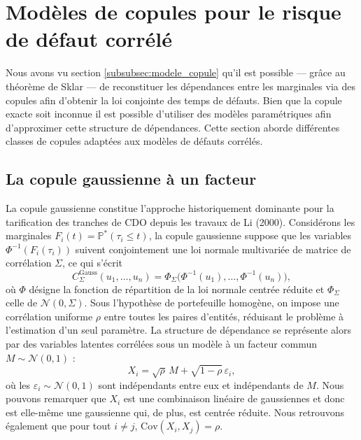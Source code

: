 \section{Modèles de copules pour le risque de défaut corrélé}

Nous avons vu section \ref{subsubsec:modele_copule} qu'il est possible --- grâce au théorème de Sklar ---
de reconstituer les dépendances entre les marginales via des copules afin d'obtenir la loi conjointe 
des temps de défauts. Bien que la copule exacte soit inconnue il est possible d'utiliser des modèles
paramétriques afin d'approximer cette structure de dépendances. Cette section aborde différentes
classes de copules adaptées aux modèles de défauts corrélés.

\subsection{La copule gaussienne à un facteur}\label{subsec:copule_gauss}

La copule gaussienne constitue l'approche historiquement dominante pour la tarification
des tranches de CDO depuis les travaux de Li (2000). Considérons les marginales 
$F_i(t) = \mathbb{P}^*(\tau_i \leq t)$, la copule gaussienne suppose que les variables
$\Phi^{-1}(F_i(\tau_i))$ suivent conjointement une loi normale multivariée de matrice de
corrélation $\Sigma$, ce qui s'écrit
\begin{equation}
    C^\text{Gauss}_\Sigma(u_1, \ldots, u_n) = \Phi_\Sigma\bigl(\Phi^{-1}(u_1), \ldots, \Phi^{-1}(u_n)\bigr),
\end{equation}
où $\Phi$ désigne la fonction de répartition de la loi normale centrée réduite et $\Phi_\Sigma$ celle de
$\mathcal{N}(0, \Sigma)$. Sous l'hypothèse de portefeuille homogène, on impose une corrélation uniforme
$\rho$ entre toutes les paires d'entités, réduisant le problème à l'estimation d'un seul paramètre.
La structure de dépendance se représente alors par des variables latentes corrélées sous un modèle à un facteur commun $M \sim \mathcal{N}(0,1)$ :
\begin{equation}
    X_i = \sqrt{\rho}\, M + \sqrt{1-\rho}\, \varepsilon_i,
    \label{eq:facteur_gauss}
\end{equation}
où les $\varepsilon_i \sim \mathcal{N}(0,1)$ sont indépendants entre eux et indépendants de $M$.
Nous pouvons remarquer que $X_i$ est une combinaison linéaire de gaussiennes et donc est elle-même une
gaussienne qui, de plus, est centrée réduite. Nous retrouvons également que pour tout $i\neq j$, $\text{Cov}(X_i,X_j)=\rho$.

